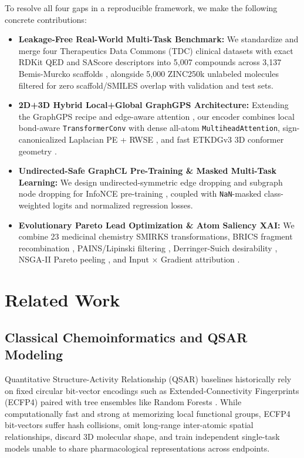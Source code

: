\documentclass[conference]{IEEEtran}
\begin{document}
To resolve all four gaps in a reproducible framework, we make the following concrete contributions:
\begin{itemize}
    \item \textbf{Leakage-Free Real-World Multi-Task Benchmark:} We standardize and merge four Therapeutics Data Commons (TDC) clinical datasets \cite{Huang2021TDC,Ma2008Bioavailability,Martins2012BBB,Wang2016hERG,Karim2021CardioTox} with exact RDKit QED \cite{Bickerton2012QED} and SAScore \cite{Ertl2009SAScore} descriptors into 5,007 compounds across 3,137 Bemis-Murcko scaffolds \cite{Bemis1996Murcko}, alongside 5,000 ZINC250k unlabeled molecules \cite{GomezBombarelli2018,Sterling2015ZINC} filtered for zero scaffold/SMILES overlap with validation and test sets.
    \item \textbf{2D+3D Hybrid Local+Global GraphGPS Architecture:} Extending the GraphGPS recipe \cite{Rampasek2022GraphGPS} and edge-aware attention \cite{Shi2021TransformerConv}, our encoder combines local bond-aware \texttt{TransformerConv} with dense all-atom \texttt{MultiheadAttention}, sign-canonicalized Laplacian PE + RWSE \cite{Dwivedi2022LSPE}, and fast ETKDGv3 3D conformer geometry \cite{Riniker2015ETKDG}.
    \item \textbf{Undirected-Safe GraphCL Pre-Training \& Masked Multi-Task Learning:} We design undirected-symmetric edge dropping and subgraph node dropping \cite{You2020GraphCL,Wang2022MolCLR} for InfoNCE pre-training \cite{Chen2020SimCLR}, coupled with \texttt{NaN}-masked class-weighted logits and normalized regression losses.
    \item \textbf{Evolutionary Pareto Lead Optimization \& Atom Saliency XAI:} We combine 23 medicinal chemistry SMIRKS transformations, BRICS fragment recombination \cite{Degen2008BRICS}, PAINS/Lipinski filtering \cite{Baell2010PAINS,Lipinski2001Ro5}, Derringer-Suich desirability \cite{Derringer1980Desirability}, NSGA-II Pareto peeling \cite{Deb2002NSGA2}, and Input $\times$ Gradient attribution \cite{Shrikumar2017InputGrad}.
\end{itemize}

\section{Related Work}
\subsection{Classical Chemoinformatics and QSAR Modeling}
Quantitative Structure-Activity Relationship (QSAR) baselines historically rely on fixed circular bit-vector encodings such as Extended-Connectivity Fingerprints (ECFP4) \cite{Rogers2010ECFP} paired with tree ensembles like Random Forests \cite{Breiman2001RF}. While computationally fast and strong at memorizing local functional groups, ECFP4 bit-vectors suffer hash collisions, omit long-range inter-atomic spatial relationships, discard 3D molecular shape, and train independent single-task models unable to share pharmacological representations across endpoints.
\end{document}
